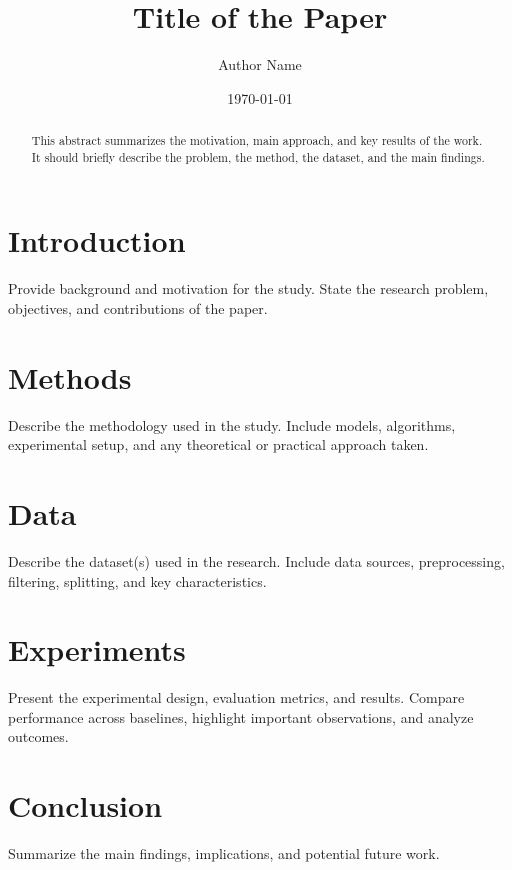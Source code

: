 \documentclass{article}
\title{Title of the Paper}
\author{Author Name}
\date{\today}
\begin{document}
\maketitle

\begin{abstract}
This abstract summarizes the motivation, main approach, and key results of the work. It should briefly describe the problem, the method, the dataset, and the main findings.
\end{abstract}

\section{Introduction}
Provide background and motivation for the study. State the research problem, objectives, and contributions of the paper.

\section{Methods}
Describe the methodology used in the study. Include models, algorithms, experimental setup, and any theoretical or practical approach taken.

\section{Data}
Describe the dataset(s) used in the research. Include data sources, preprocessing, filtering, splitting, and key characteristics.

\section{Experiments}
Present the experimental design, evaluation metrics, and results. Compare performance across baselines, highlight important observations, and analyze outcomes.

\section{Conclusion}
Summarize the main findings, implications, and potential future work.
\end{document}
